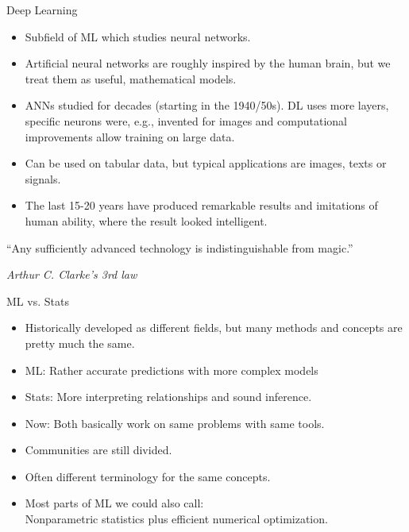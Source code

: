 \documentclass[11pt,compress,t,notes=noshow, xcolor=table]{beamer}
\begin{document}
\begin{vbframe}{Deep Learning}

\begin{itemize}
\item Subfield of ML which studies neural networks.
\item Artificial neural networks are roughly inspired by the human brain, but we treat them as useful, mathematical models.
\item ANNs studied for decades (starting in the 1940/50s). DL uses more layers, 
        specific neurons were, e.g., invented for images and computational 
        improvements allow training on large data.
\item Can be used on tabular data, but typical applications are images, texts or signals. 
\item The last 15-20 years have produced remarkable results and imitations of human ability, where the result looked intelligent. 
\end{itemize}

\lz

``Any sufficiently advanced technology is indistinguishable from magic.''
\begin{footnotesize}
\emph{Arthur C. Clarke's 3rd law}
\end{footnotesize}
 

\end{vbframe}


\begin{frame}{ML vs. Stats}


\begin{itemize}
	\item Historically developed as different fields, but many
      methods and concepts are pretty much the same.
	\item ML: Rather accurate predictions with more complex models
    \item Stats: More interpreting relationships and sound inference.
	\item Now: Both basically work on same problems with same tools.
    \item Communities are still divided.
    \item Often different terminology for the same concepts.
    \item Most parts of ML we could also call:\\Nonparametric statistics plus efficient numerical optimization.
\end{itemize}

\end{frame}
\end{document}
